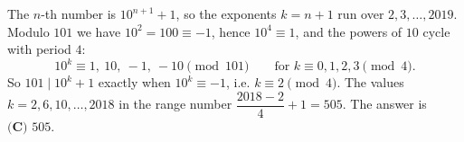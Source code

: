 The $n$-th number is $10^{n+1}+1$, so the exponents $k=n+1$ run over $2,3,\dots,2019$. Modulo $101$ we have $10^2=100\equiv-1$, hence $10^4\equiv1$, and the powers of $10$ cycle with period $4$:
\[10^k\equiv1,\ 10,\ -1,\ -10\pmod{101}\qquad\text{for }k\equiv0,1,2,3\pmod4.\]
So $101\mid10^k+1$ exactly when $10^k\equiv-1$, i.e. $k\equiv2\pmod4$. The values $k=2,6,10,\dots,2018$ in the range number $\dfrac{2018-2}{4}+1=505$. The answer is $\boxed{\textbf{(C) }505}$.
